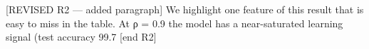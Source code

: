 [REVISED R2 — added paragraph]
We highlight one feature of this result that is easy to miss in the table. At ρ = 0.9 the model has a near-saturated learning signal (test accuracy 99.7%
[end R2]

